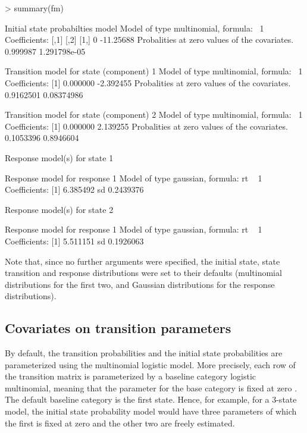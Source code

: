 \documentclass[article]{jss}
\begin{document}
\begin{CodeChunk}
\begin{CodeInput}
> summary(fm)
\end{CodeInput}
\begin{CodeOutput}
Initial state probabilties model 
Model of type multinomial, formula: ~1
Coefficients: 
     [,1]      [,2]
[1,]    0 -11.25688
Probalities at zero values of the covariates.
0.999987 1.291798e-05 

Transition model for state (component) 1 
Model of type multinomial, formula: ~1
Coefficients: 
[1]  0.000000 -2.392455
Probalities at zero values of the covariates.
0.9162501 0.08374986 

Transition model for state (component) 2 
Model of type multinomial, formula: ~1
Coefficients: 
[1] 0.000000 2.139255
Probalities at zero values of the covariates.
0.1053396 0.8946604 

Response model(s) for state 1 

Response model for response 1 
Model of type gaussian, formula: rt ~ 1
Coefficients: 
[1] 6.385492
sd  0.2439376 

Response model(s) for state 2 

Response model for response 1 
Model of type gaussian, formula: rt ~ 1
Coefficients: 
[1] 5.511151
sd  0.1926063 
\end{CodeOutput}
\end{CodeChunk}

Note that, since no further arguments were specified, the initial state, 
state transition and response distributions were set to their defaults 
(multinomial distributions for the first two, and Gaussian distributions for the
response distributions). 

\subsection{Covariates on transition parameters}

By default, the transition probabilities and the initial state probabilities
are parameterized using the multinomial
logistic model. More precisely, each row of the transition matrix is
parameterized by a baseline category logistic multinomial, 
meaning that the parameter for the
base category is fixed at zero \citep[see][p.\ 267
ff., for multinomial logistic models and various
parameterizations]{Agresti2002}. The default baseline category is the 
first state. Hence, for example, for a 3-state model, the initial state probability
model would have three parameters of which the first is fixed at zero
and the other two are freely estimated. 
\end{document}
